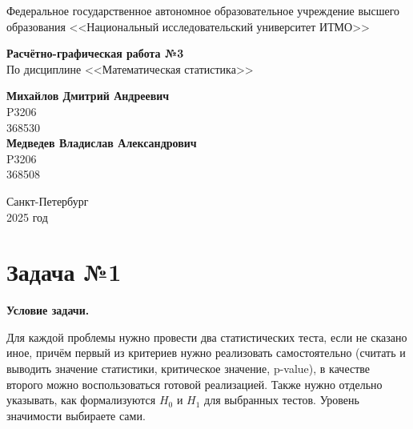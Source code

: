 \documentclass[12pt]{article}
\begin{document}
	
	\begin{titlepage}
		\begin{center}
			\large{Федеральное государственное автономное образовательное учреждение высшего образования <<Национальный исследовательский университет ИТМО>>}
		\end{center}
		
		\vspace{15em}
		
		\begin{center}
			\huge{\textbf{Расчётно-графическая работа №3}} \\
			\large{По дисциплине <<Математическая статистика>>}
		\end{center}
		
		\vspace{5em}
		
		\begin{flushright}
			\Large{\textbf{Михайлов Дмитрий Андреевич}} \\
			\Large{P3206} \\
			\Large{368530} \\
			\Large{\textbf{Медведев Владислав Александрович}} \\
			\Large{P3206} \\
			\Large{368508}
		\end{flushright}
		
		\vspace{10em}
		
		\begin{center}
			Санкт-Петербург \\
			2025 год
		\end{center}
	\end{titlepage}
	
	\tableofcontents
	\newpage
	
	\section*{Задача №1}
	
	\textbf{Условие задачи.}
	
	Для каждой проблемы нужно провести два статистических теста, если не сказано иное, причём первый из критериев нужно реализовать самостоятельно (считать и выводить значение статистики, критическое значение, p-value), в качестве второго можно воспользоваться готовой реализацией. Также нужно отдельно указывать, как формализуются $H_0$ и $H_1$ для выбранных тестов. Уровень значимости выбираете сами.
	
\end{document}
